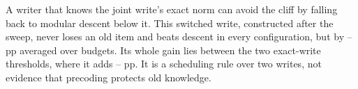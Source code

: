 A writer that knows the joint write's exact norm can avoid the cliff by falling back to modular descent below it.
This switched write, constructed after the sweep, never loses an old item and beats descent in every configuration, but by \swmin--\swmax{} pp averaged over budgets.
Its whole gain lies between the two exact-write thresholds, where it adds \swwmin--\swwmax{} pp.
It is a scheduling rule over two writes, not evidence that precoding protects old knowledge.

\begin{table}[t]
  \centering
  \caption{\textbf{All seven writes at the main configuration} (\(\vartheta=30^\circ\), \(S=0\)).
  Norm: exact-write norm relative to GPM.
  Accuracies at the budget of 0.445 GPM norms, the grid point nearest the A-null write's threshold.
  Half-lives: weight shrink \(\gamma\) at which accuracy first falls below 50\% after an exact write (larger is more robust).
  Means over \nseeds{} seeds with 95\% Student-\(t\) intervals.}
  \label{tab:arms}
  \small
  \setlength{\tabcolsep}{3.5pt}
\end{table}
